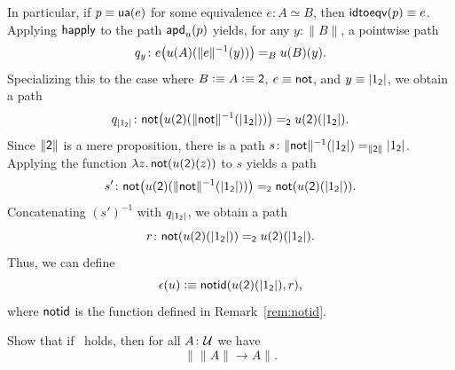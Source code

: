 \begin{solution}
    In particular, if $p\equiv\mathsf{ua}(e)$ for some equivalence $e\colon A\simeq B$, then $\mathsf{idtoeqv}(p)\equiv e$. Applying $\mathsf{happly}$ to the path $\mathsf{apd}_u(p)$ yields, for any $y\colon\lVert B\rVert$, a pointwise path
    \[
        q_y\colon e\bigl(u(A)(\lVert e\rVert^{-1}(y))\bigr) \eq{B} u(B)(y).
    \]
    Specializing this to the case where $B\mathrel{\vcentcolon}\equiv A\mathrel{\vcentcolon}\equiv\mathsf{2}$, $e\equiv\mathsf{not}$, and $y\equiv\lvert 1_{\mathsf{2}}\rvert$, we obtain a path
    \[
        q_{\lvert 1_{\fun2}\rvert}\colon
            \fun{not}\bigl(u(\fun2)(\lVert\fun{not}\rVert^{-1}(\lvert 1_{\fun2}\rvert))\bigr)
            \eq{\fun2}
            u(\fun2)(\lvert 1_{\fun2}\rvert).
    \]
    Since $\lVert\mathsf{2}\rVert$ is a mere proposition, there is a path $s\colon\lVert\fun{not}\rVert^{-1}(\lvert 1_{\fun2}\rvert)\eq{\lVert\fun2\rVert}\lvert 1_{\fun2}\rvert$. Applying the function $\lambda z.\,\mathsf{not}(u(\mathsf{2})(z))$ to $s$ yields a path
    \[
        s'\colon \fun{not}\bigl(u(\fun2)(\lVert\fun{not}\rVert^{-1}(\lvert 1_{\fun2}\rvert))\bigr)
        \eq{\fun2}
        \fun{not}(u(\fun2)(\lvert 1_{\fun2}\rvert)).
    \]
    Concatenating $(s')^{-1}$ with $q_{\lvert 1_{\mathsf{2}}\rvert}$, we obtain a path
    \[
        r\colon\fun{not}(u(\fun2)(\lvert 1_{\fun2}\rvert))\eq{\fun2}u(\fun2)(\lvert 1_{\fun2}\rvert).
    \]
    Thus, we can define
    \[
        \epsilon(u)\mathrel{\vcentcolon}\equiv\mathsf{notid}(u(\mathsf{2})(\lvert 1_{\mathsf{2}}\rvert),r),
    \]
    where $\mathsf{notid}$ is the function defined in Remark~\ref{rem:notid}.
\end{solution}

\begin{exr}
    Show that if\/ \Lem\ holds, then for all\/ $A\colon\univ$ we have
    \[
        \bigl\lVert\lVert A\rVert\to A\bigr\rVert.
    \]
\end{exr}

